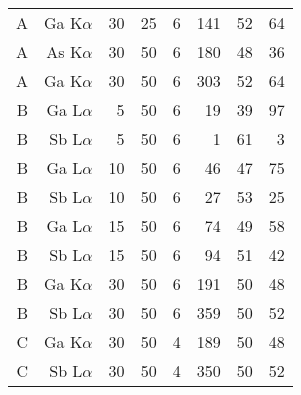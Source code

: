 \begin{table}[phtb]
\begin{center}
\begin{tabular}{rrrrrrrr}
            A               & Ga K$\alpha$  & 30             & 25             & 6           & 141                & 52                   & 64                             \\
            A               & As K$\alpha$  & 30             & 50             & 6           & 180                & 48                   & 36                             \\
            A               & Ga K$\alpha$  & 30             & 50             & 6           & 303                & 52                   & 64                             \\
            \hline
            B               & Ga L$\alpha$  & 5              & 50             & 6           & 19                 & 39                   & 97                             \\
            B               & Sb L$\alpha$  & 5              & 50             & 6           & 1                  & 61                   & 3                              \\
            B               & Ga L$\alpha$  & 10             & 50             & 6           & 46                 & 47                   & 75                             \\
            B               & Sb L$\alpha$  & 10             & 50             & 6           & 27                 & 53                   & 25                             \\
            B               & Ga L$\alpha$  & 15             & 50             & 6           & 74                 & 49                   & 58                             \\
            B               & Sb L$\alpha$  & 15             & 50             & 6           & 94                 & 51                   & 42                             \\
            B               & Ga K$\alpha$  & 30             & 50             & 6           & 191                & 50                   & 48                             \\
            B               & Sb L$\alpha$  & 30             & 50             & 6           & 359                & 50                   & 52                             \\
            \hline
            C               & Ga K$\alpha$  & 30             & 50             & 4           & 189                & 50                   & 48                             \\
            C               & Sb L$\alpha$  & 30             & 50             & 4           & 350                & 50                   & 52                             \\

\end{tabular}
\end{center}
\end{table}
